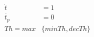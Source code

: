 \documentclass[10pt]{article}
\begin{document}
\begin{align*}\dot{t} &= 1 \\
\dot{t_p} & =0 \\
Th = max&\{minTh,decTh\}

\end{align*}
\end{document}
